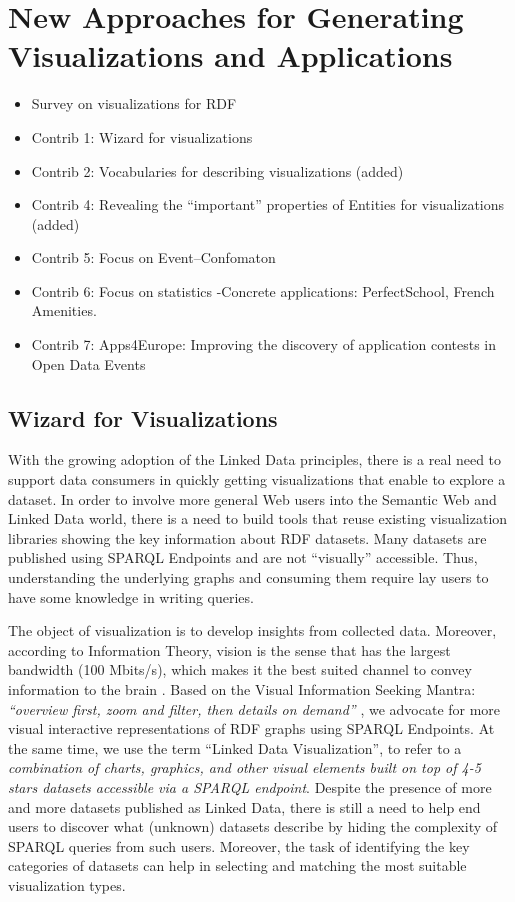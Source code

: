 \chapter{New Approaches for Generating Visualizations and Applications}
\label{ch:ch5}

\begin{itemize}
\item Survey on visualizations for RDF
\item Contrib 1: Wizard for visualizations
\item Contrib 2: Vocabularies for describing visualizations (added)
\item Contrib 4: Revealing the ``important'' properties of Entities for visualizations (added)
\item Contrib 5: Focus on Event--Confomaton
\item Contrib 6: Focus on statistics -Concrete applications: PerfectSchool, French Amenities.
\item Contrib 7: Apps4Europe: Improving the discovery of application contests in Open Data Events

\end{itemize}

\section{Wizard for Visualizations}


With the growing adoption of the Linked Data principles, there is a real need to support data consumers in quickly getting visualizations that enable to explore a dataset. In order to involve more general Web users into the Semantic Web and Linked Data world, there is a need to build tools that reuse existing visualization libraries showing the key information about RDF datasets. Many datasets are published using SPARQL Endpoints and are not ``visually'' accessible. Thus, understanding the underlying graphs and consuming them require lay users to have some knowledge in writing queries. 

The object of visualization is to develop insights from collected data. Moreover, according to Information Theory, vision is the sense that has the largest bandwidth (100 Mbits/s), which makes it the best suited channel to convey information to the brain \cite{Ware:2014}. Based on the Visual Information Seeking Mantra: \textit{``overview first, zoom and filter, then details on demand''} \cite{Shneiderman99}, we advocate for more visual interactive representations of RDF graphs using SPARQL Endpoints.   At the same time,  we use the term ``Linked Data Visualization'', to refer to a \textit{combination of charts, graphics, and other visual elements built on top of 4-5 stars datasets accessible via a SPARQL endpoint}. 
Despite the presence of more and more datasets published as Linked Data, there is still a need to help end users to discover what (unknown) datasets describe by hiding the complexity of SPARQL queries from such users. Moreover, the task of identifying the key categories of datasets can help in selecting and matching the most suitable visualization types.

